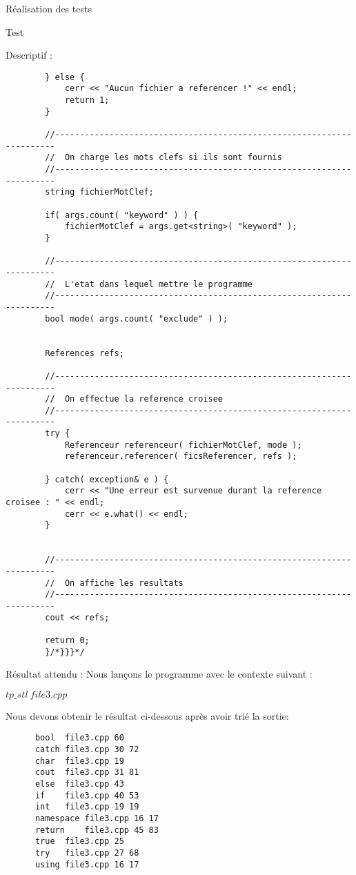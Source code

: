 \documentclass{article}
\begin{document}
\begin{section}{Réalisation des tests}
\begin{subsection}{Test }
\begin{paragraph}{Descriptif :}
\begin{verbatim}
		} else {
		    cerr << "Aucun fichier a referencer !" << endl;
		    return 1;
		}

		//----------------------------------------------------------------------
		//  On charge les mots clefs si ils sont fournis
		//----------------------------------------------------------------------
		string fichierMotClef;

		if( args.count( "keyword" ) ) {
		    fichierMotClef = args.get<string>( "keyword" );
		}

		//----------------------------------------------------------------------
		//  L'etat dans lequel mettre le programme
		//----------------------------------------------------------------------
		bool mode( args.count( "exclude" ) );


		References refs;

		//----------------------------------------------------------------------
		//  On effectue la reference croisee
		//----------------------------------------------------------------------
		try {
		    Referenceur referenceur( fichierMotClef, mode );
		    referenceur.referencer( ficsReferencer, refs );

		} catch( exception& e ) {
		    cerr << "Une erreur est survenue durant la reference croisee : " << endl;
		    cerr << e.what() << endl;
		}


		//----------------------------------------------------------------------
		//  On affiche les resultats
		//----------------------------------------------------------------------
		cout << refs;

		return 0;
	    }/*}}}*/
      \end{verbatim}
      
    \end{paragraph}
    
    \newpage 
    
    \begin{paragraph}{Résultat attendu :}
       Nous lançons le programme avec le contexte suivant :  
       \begin{center}
	\textbf{$tp\_stl\ file3.cpp$}
      \end{center}
      
      Nous devons obtenir le résultat ci-dessous après avoir trié la sortie: 
      \begin{listing}[h!]
      \begin{verbatim}
	  bool	file3.cpp 60	
	  catch	file3.cpp 30 72	
	  char	file3.cpp 19	
	  cout	file3.cpp 31 81	
	  else	file3.cpp 43	
	  if	file3.cpp 40 53	
	  int	file3.cpp 19 19	
	  namespace	file3.cpp 16 17	
	  return	file3.cpp 45 83	
	  true	file3.cpp 25	
	  try	file3.cpp 27 68	
	  using	file3.cpp 16 17		
      \end{verbatim}
  

\end{listing}
\end{paragraph}
\end{subsection}
\end{section}
\end{document}
